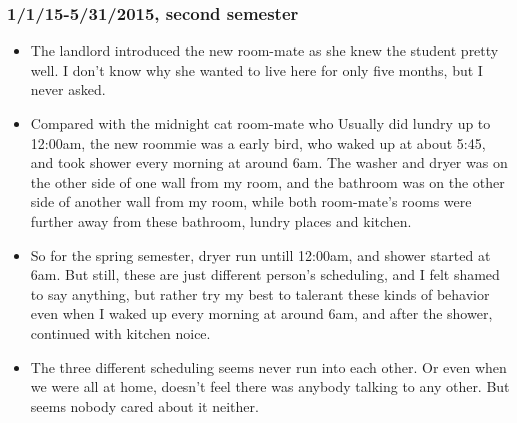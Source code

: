 \documentclass[9pt,b5paper]{article}
\begin{document}
\subsubsection{1/1/15-5/31/2015, second semester}
\label{sec-2-3-2}
\begin{itemize}
\item The landlord introduced the new room-mate as she knew the student pretty well. I don't know why she wanted to live here for only five months, but I never asked.
\item Compared with the midnight cat room-mate who Usually did lundry up to 12:00am, the new roommie was a early bird, who waked up at about 5:45, and took shower every morning at around 6am. The washer and dryer was on the other side of one wall from my room, and the bathroom was on the other side of another wall from my room, while both room-mate's rooms were further away from these bathroom, lundry places and kitchen.
\item So for the spring semester, dryer run untill 12:00am, and shower started at 6am. But still, these are just different person's scheduling, and I felt shamed to say anything, but rather try my best to talerant these kinds of behavior even when I waked up every morning at around 6am, and after the shower, continued with kitchen noice.
\item The three different scheduling seems never run into each other. Or even when we were all at home, doesn't feel there was anybody talking to any other. But seems nobody cared about it neither.
\end{itemize}
\end{document}
